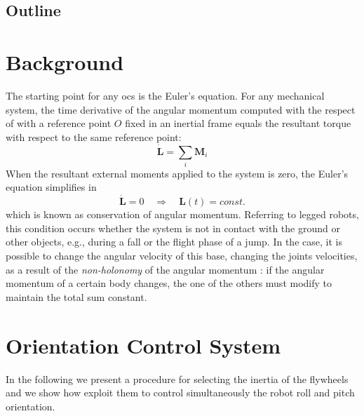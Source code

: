 \documentclass[letterpaper, 10 pt, conference]{ieeeconf}  %
\begin{document}
\subsection{Outline}
\lipsum[1]
% 

\section{Background}
The starting point for any \gls{ocs} is the Euler's equation. For any mechanical system, the time derivative of the angular momentum computed with the respect of with a reference point $O$ fixed in an inertial frame equals
the resultant torque with respect to the same reference point:
\begin{equation}
	\dot{\bm{L}} = \sum_i \bm{M}_i
\end{equation}
When the resultant external moments applied to the system is zero, the Euler’s equation simplifies in
\begin{equation}
\dot{\bm{L}} = 0 \quad \Rightarrow \quad \bm{L}(t) = const.
\label{eq:cons_ang_mom}
\end{equation}
which is known as conservation of angular momentum.
Referring to legged robots, this condition occurs whether the system is not in contact with the ground or other objects, e.g., during a fall or the flight phase of a jump.
In the case, it is possible to change the angular velocity of this base, changing the joints velocities, as a result of the \textit{non-holonomy} of the angular momentum \cite{Wieber16}: if the angular momentum of a certain body changes, the one of the others must modify to maintain the total sum constant.

\section{Orientation Control System}
In the following we present a procedure for selecting the inertia of the flywheels and we show how exploit them to control simultaneously the robot roll and pitch orientation.
\end{document}
